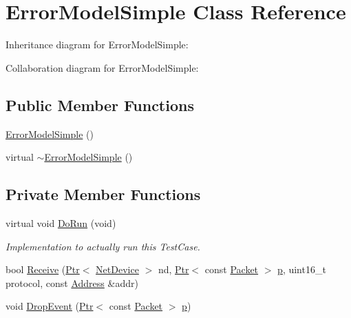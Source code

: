 \hypertarget{classErrorModelSimple}{}\section{Error\+Model\+Simple Class Reference}
\label{classErrorModelSimple}


Inheritance diagram for Error\+Model\+Simple\+:


Collaboration diagram for Error\+Model\+Simple\+:
\subsection*{Public Member Functions}
\begin{DoxyCompactItemize}
\item 
\hyperlink{classErrorModelSimple_af73323568b4d218316f9e10415334720}{Error\+Model\+Simple} ()
\item 
virtual \hyperlink{classErrorModelSimple_a1f42d214ec591810ace8f61052c563fe}{$\sim$\+Error\+Model\+Simple} ()
\end{DoxyCompactItemize}
\subsection*{Private Member Functions}
\begin{DoxyCompactItemize}
\item 
virtual void \hyperlink{classErrorModelSimple_a84102bc3eba0940652e50e78771e1852}{Do\+Run} (void)
\begin{DoxyCompactList}\small\item\em Implementation to actually run this Test\+Case. \end{DoxyCompactList}\item 
bool \hyperlink{classErrorModelSimple_a0dfbcbf99f60deae690b469364086707}{Receive} (\hyperlink{classns3_1_1Ptr}{Ptr}$<$ \hyperlink{classns3_1_1NetDevice}{Net\+Device} $>$ nd, \hyperlink{classns3_1_1Ptr}{Ptr}$<$ const \hyperlink{classns3_1_1Packet}{Packet} $>$ \hyperlink{lte__link__budget__x2__handover__measures_8m_ac9de518908a968428863f829398a4e62}{p}, uint16\+\_\+t protocol, const \hyperlink{classns3_1_1Address}{Address} \&addr)
\item 
void \hyperlink{classErrorModelSimple_ae0aaa53c27194a91370e022dbb5f9452}{Drop\+Event} (\hyperlink{classns3_1_1Ptr}{Ptr}$<$ const \hyperlink{classns3_1_1Packet}{Packet} $>$ \hyperlink{lte__link__budget__x2__handover__measures_8m_ac9de518908a968428863f829398a4e62}{p})
\end{DoxyCompactItemize}
